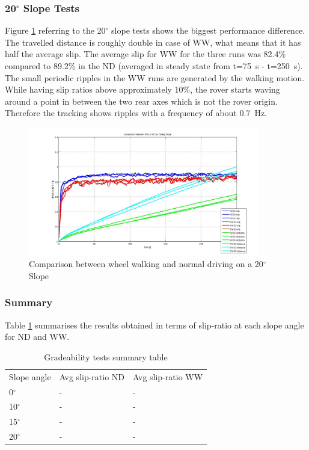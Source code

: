 \documentclass[a4paper,twocolumn]{esapub2005} %
\begin{document}
\subsubsection*{20$^{\circ}$ Slope Tests}
Figure \ref{fig:20d} referring to the 20$^\circ$ slope tests shows the biggest performance difference. The travelled distance is roughly double in case of WW, what means that it has half the average slip. The average slip for WW for the three runs was 82.4\% compared to 89.2\% in the ND (averaged in steady state
from t=75~\unit{s} - t=250~\unit{s}).
The small periodic ripples in the WW runs are generated by the walking motion. While having slip ratios above approximately 10\%, the rover starts waving around a point in between the two rear axes which is not the rover origin. Therefore the tracking shows ripples with a frequency of about 0.7~\unit{Hz}.

\begin{figure}[h!]
    \centering
    \includegraphics[width=0.9\textwidth]{20d.jpg}	\caption{Comparison between
    wheel walking and normal driving on a 20$^{\circ}$ Slope} \label{fig:20d}
\end{figure}

\subsubsection*{Summary}
Table \ref{tab:SlopeSummaryTable} summarises the results obtained in terms of slip-ratio at each slope angle for ND and WW.

\begin{table}[h]
	\begin{tabular}{lll}
	Slope angle & Avg slip-ratio ND & Avg slip-ratio WW \\
	0$^{\circ}$       & -                 & -                 \\
	10$^{\circ}$      & -                 & -                 \\
	15$^{\circ}$      & -                 & -                 \\
	20$^{\circ}$      & -                 & -                
	\end{tabular}
	\caption{Gradeability tests summary table}
	\label{tab:SlopeSummaryTable}
\end{table}
\end{document}
